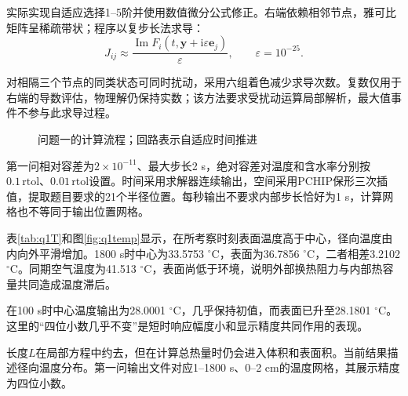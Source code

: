 实际实现自适应选择1--5阶并使用数值微分公式修正。右端依赖相邻节点，雅可比矩阵呈稀疏带状；程序以复步长法求导\cite{martins}：
\begin{equation}
J_{ij}\approx
\frac{\operatorname{Im}F_i(t,\bm y+\mathrm{i}\varepsilon\bm e_j)}
{\varepsilon},\qquad \varepsilon=10^{-25}.
\label{eq:complex}
\end{equation}

对相隔三个节点的同类状态可同时扰动，采用六组着色减少求导次数。复数仅用于右端的导数评估，物理解仍保持实数；该方法要求受扰动运算局部解析，最大值事件不参与此求导过程。

\begin{figure}[H]\centering
{}
\caption{问题一的计算流程；回路表示自适应时间推进}\label{fig:algorithm}
\end{figure}

第一问相对容差为$2\times10^{-11}$、最大步长2 s，绝对容差对温度和含水率分别按$0.1\,\mathrm{rtol}$、$0.01\,\mathrm{rtol}$设置。时间采用求解器连续输出，空间采用PCHIP保形三次插值\cite{fritsch,pchipdocs}，提取题目要求的21个半径位置。每秒输出不要求内部步长恰好为1 s，计算网格也不等同于输出位置网格。



表\ref{tab:q1T}和图\ref{fig:q1temp}显示，在所考察时刻表面温度高于中心，径向温度由内向外平滑增加。1800 s时中心为33.5753 $^\circ$C，表面为36.7856 $^\circ$C，二者相差3.2102 $^\circ$C。同期空气温度为41.513 $^\circ$C，表面尚低于环境，说明外部换热阻力与内部热容量共同造成温度滞后。

在100 s时中心温度输出为28.0001 $^\circ$C，几乎保持初值，而表面已升至28.1801 $^\circ$C。这里的“四位小数几乎不变”是短时响应幅度小和显示精度共同作用的表现。

长度$L$在局部方程中约去，但在计算总热量时仍会进入体积和表面积。当前结果描述径向温度分布。第一问输出文件对应1--1800 s、0--2 cm的温度网格，其展示精度为四位小数。

